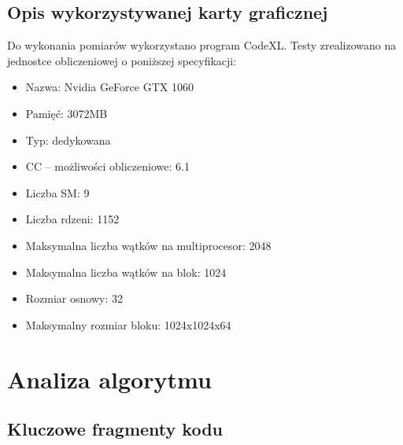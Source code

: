 \documentclass{article}
\begin{document}
\subsection{Opis wykorzystywanej karty graficznej}
Do wykonania pomiarów wykorzystano program CodeXL. Testy zrealizowano na jednostce obliczeniowej o poniższej specyfikacji:
\begin{itemize}
\item Nazwa: Nvidia GeForce GTX 1060
\item Pamięć: 3072MB
\item Typ: dedykowana
\item CC – możliwości obliczeniowe: 6.1
\item Liczba SM: 9
\item Liczba rdzeni: 1152
\item Maksymalna liczba wątków na multiprocesor: 2048
\item Maksymalna liczba wątków na blok: 1024
\item Rozmiar osnowy: 32
\item Maksymalny rozmiar bloku: 1024x1024x64
\end{itemize}

\section{Analiza algorytmu}
\subsection{Kluczowe fragmenty kodu}
\end{document}
